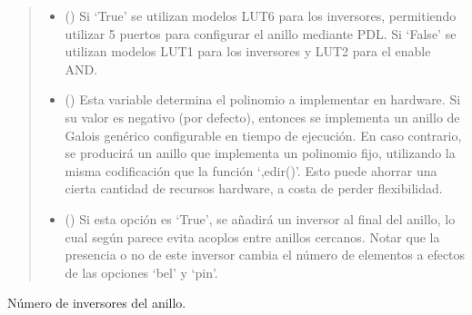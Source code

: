 \documentclass[letterpaper,10pt,english]{sphinxmanual}
\begin{document}
\begin{fulllineitems}
\begin{quote}
\begin{description}
\begin{itemize}
\item {} 
\sphinxAtStartPar
{} (\sphinxstyleliteralemphasis{\sphinxupquote{, }}) \textendash{} Si ‘True’ se utilizan modelos LUT6 para los inversores, permitiendo utilizar 5 puertos para configurar el anillo mediante PDL. Si ‘False’ se utilizan modelos LUT1 para los inversores y LUT2 para el enable AND.

\item {} 
\sphinxAtStartPar
{} (\sphinxstyleliteralemphasis{\sphinxupquote{, }}) \textendash{} Esta variable determina el polinomio a implementar en hardware. Si su valor es negativo (por defecto), entonces se implementa un anillo de Galois genérico configurable en tiempo de ejecución. En caso contrario, se producirá un anillo que implementa un polinomio fijo, utilizando la misma codificación que la función ‘,edir()’. Esto puede ahorrar una cierta cantidad de recursos hardware, a costa de perder flexibilidad.

\item {} 
\sphinxAtStartPar
{} (\sphinxstyleliteralemphasis{\sphinxupquote{, }}) \textendash{} Si esta opción es ‘True’, se añadirá un inversor al final del anillo, lo cual según parece evita acoplos entre anillos cercanos. Notar que la presencia o no de este inversor cambia el número de elementos a efectos de las opciones ‘bel’ y ‘pin’.

\end{itemize}

\end{description}\end{quote}

\begin{fulllineitems}
\label{\detokenize{fpga.ring_osc:fpga.ring_osc.GaloisRing.N_inv}}
\pysigstartsignatures
{}
\pysigstopsignatures
\sphinxAtStartPar
Número de inversores del anillo.

\end{fulllineitems}


\end{fulllineitems}
\end{document}
